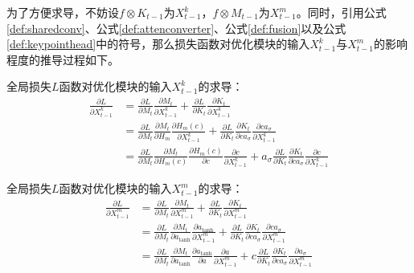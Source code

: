 为了方便求导，不妨设$f \otimes K_{t-1}$为$X^k_{t-1}$，$f \otimes M_{t-1}$为$X^m_{t-1}$。同时，引用公式\eqref{def:sharedconv}、公式\eqref{def:attenconverter}、公式\eqref{def:fusion}以及公式\eqref{def:keypointhead}中的符号，那么损失函数对优化模块的输入$X^k_{t-1}$与$X^m_{t-1}$的影响程度的推导过程如下。
\begin{corollary}
\label{corollary:loss2xk}
全局损失$L$函数对优化模块的输入$X^k_{t-1}$的求导：
\begin{equation*}
\begin{aligned}
\frac{\partial L}{\partial X_{t-1}^k} &= \frac{\partial L}{\partial M_t}\frac{\partial M_t}{\partial X_{t-1}^k} + \frac{\partial L}{\partial K_t}\frac{\partial K_t}{\partial X_{t-1}^k}\\
&= \frac{\partial L}{\partial M_t}\frac{\partial M_t}{\partial H_m}\frac{\partial H_m(c)}{\partial X_{t-1}^k} + \frac{\partial L}{\partial K_t}\frac{\partial K_t}{\partial ca_{\sigma}}\frac{\partial ca_{\sigma}}{\partial X_{t-1}^k}\\
&= \frac{\partial L}{\partial M_t}\frac{\partial M_t}{\partial H_m(c)}\frac{\partial H_m(c)}{\partial c}\frac{\partial c}{\partial X_{t-1}^k} + a_{\sigma}\frac{\partial L}{\partial K_t}\frac{\partial K_t}{\partial ca_{\sigma}}\frac{\partial c}{\partial X_{t-1}^k}
\end{aligned}
\end{equation*}
\end{corollary}
\begin{corollary}
\label{corollary:loss2xm}
全局损失$L$函数对优化模块的输入$X^m_{t-1}$的求导：
\begin{equation*}
\begin{aligned}
\frac{\partial L}{\partial X^m_{t-1}} &= \frac{\partial L}{\partial M_t}\frac{\partial M_t}{\partial X^m_{t-1}} + \frac{\partial L}{\partial K_t}\frac{\partial K_t}{\partial X^m_{t-1}}\\
&=\frac{\partial L}{\partial M_t}\frac{\partial M_t}{\partial a_{\tanh}}\frac{\partial a_{\tanh}}{\partial X^m_{t-1}} + \frac{\partial L}{\partial K_t}\frac{\partial K_t}{\partial ca_{\sigma}}\frac{\partial ca_{\sigma}}{\partial X^m_{t-1}}\\
&=\frac{\partial L}{\partial M_t}\frac{\partial M_t}{\partial a_{\tanh}}\frac{\partial a_{\tanh}}{\partial a}\frac{\partial a}{\partial X^m_{t-1}} + c\frac{\partial L}{\partial K_t}\frac{\partial K_t}{\partial ca_{\sigma}}\frac{\partial a_{\sigma}}{\partial X^m_{t-1}}
\end{aligned}
\end{equation*}
\end{corollary}

